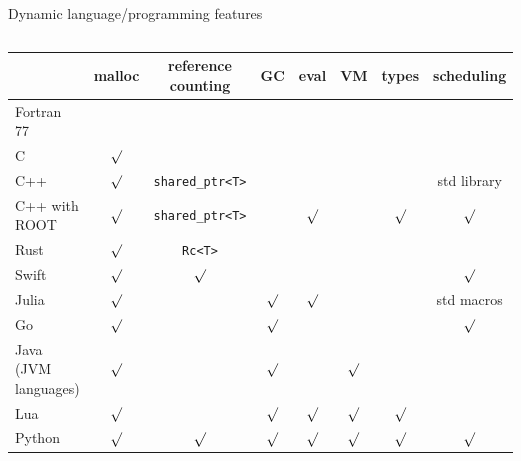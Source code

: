 \documentclass[aspectratio=169]{beamer}
\begin{document}
\begin{frame}{Dynamic language/programming features}
\begin{columns}
\begin{center}\renewcommand{\arraystretch}{1.25}
\begin{tabular}{l | c | c | c | c | c | c | c}
                     & malloc   & reference counting              & GC      & eval    & VM      & types   & scheduling \\\hline
Fortran 77           &          &                                 &         &         &         &         &            \\
C                    & $\surd$  &                                 &         &         &         &         &            \\
C++                  & $\surd$  & \texttt{shared_ptr<T>} &         &         &         &         & std library \\
C++ with ROOT        & $\surd$  & \texttt{shared_ptr<T>} &         & $\surd$ &         & $\surd$ & $\surd$     \\
Rust                 & $\surd$  & \texttt{Rc<T>}         &         &         &         &         &             \\
Swift                & $\surd$  & $\surd$                         &         &         &         &         & $\surd$     \\
Julia                & $\surd$  &                                 & $\surd$ & $\surd$ &         &         & std macros  \\
Go                   & $\surd$  &                                 & $\surd$ &         &         &         & $\surd$     \\
Java (JVM languages) & $\surd$  &                                 & $\surd$ &         & $\surd$ &         &             \\
Lua                  & $\surd$  &                                 & $\surd$ & $\surd$ & $\surd$ & $\surd$ &             \\
Python               & $\surd$  & $\surd$                         & $\surd$ & $\surd$ & $\surd$ & $\surd$ & $\surd$     \\
\end{tabular}
\end{center}
\end{columns}
\end{frame}
\end{document}
